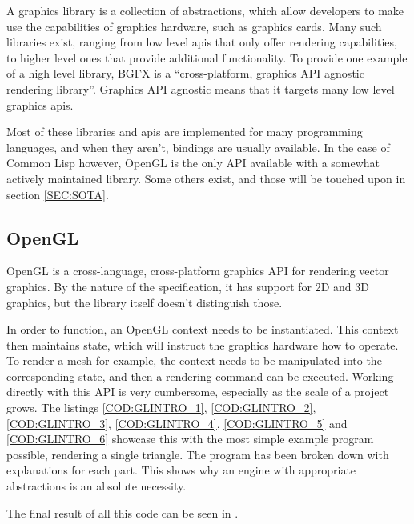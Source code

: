 A graphics library is a collection of abstractions,
which allow developers to make use the capabilities of graphics hardware,
such as graphics cards.
Many such libraries exist,
ranging from low level \ac{api}s that only offer rendering capabilities,
to higher level ones that provide additional functionality.
To provide one example of a high level library,
BGFX\cite{bgfx} is a ``cross-platform, graphics API agnostic rendering library''.
Graphics API agnostic means that it targets many low level graphics \ac{api}s.

Most of these libraries and \ac{api}s are implemented for many programming languages,
and when they aren't,
bindings are usually available.
In the case of Common Lisp however,
OpenGL is the only API available with a somewhat actively maintained library.
Some others exist,
and those will be touched upon in section \ref{SEC:SOTA}.

\subsection{OpenGL}

OpenGL\cite{khronos} is a cross-language,
cross-platform graphics API for rendering vector graphics.
By the nature of the specification,
it has support for 2D and 3D graphics,
but the library itself doesn't distinguish those.

In order to function,
an OpenGL context needs to be instantiated.
This context then maintains state,
which will instruct the graphics hardware how to operate.
To render a mesh for example,
the context needs to be manipulated into the corresponding state,
and then a rendering command can be executed.
Working directly with this API is very cumbersome,
especially as the scale of a project grows.
The listings \ref{COD:GLINTRO_1},
\ref{COD:GLINTRO_2},
\ref{COD:GLINTRO_3},
\ref{COD:GLINTRO_4},
\ref{COD:GLINTRO_5} and \ref{COD:GLINTRO_6}
showcase this with the most simple example program possible,
rendering a single triangle.
The program has been broken down with explanations for each part.
This shows why an engine with appropriate abstractions is an absolute necessity.

The final result of all this code can be seen in .


